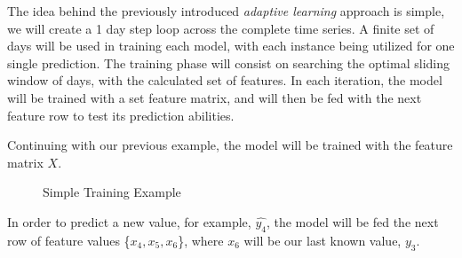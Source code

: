 \documentclass[12pt]{report} %
\begin{document}
The idea behind the previously introduced \textit{adaptive learning} approach is simple, we will create a 1 day step loop across the complete time series. A finite set of days will be used in training each model, with each instance being utilized for one single prediction. The training phase will consist on searching the optimal sliding window of days, with the calculated set of features. In each iteration, the model will be trained with a set feature matrix, and will then be fed with the next feature row to test its prediction abilities.

Continuing with our previous example, the model will be trained with the feature matrix $\mathit{X}$.

\begin{figure}[H]
    \centering
    \caption{Simple Training Example}
    \label{fig:train_example}
\end{figure}

In order to predict a new value, for example, $\hat{y_4}$, the model will be fed the next row of feature values \{$x_4, x_5, x_6$\}, where $x_6$ will be our last known value, $y_3$.
\end{document}

